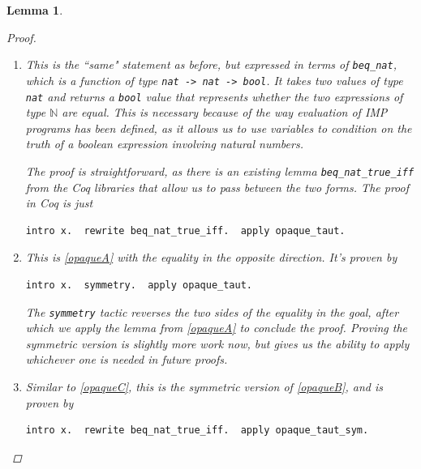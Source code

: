\documentclass[12pt,notitlepage]{report}
\theoremstyle{plain}
\newtheorem{lem}[theo]{Lemma}
\theoremstyle{definition}
\newcommand\N{\mathbb{N}}
\newcommand{\define}[1]{\emph{#1}\index{#1}}
\numberwithin{equation}{section}
\begin{document}
\begin{lem}
\begin{proof}
\begin{enumerate}
        Then, we apply \verb$rewrite -> mult_plus_distr_r$, which is analogous to the above for invoking the fact that multiplication is right-distributive over addition.  The goal now becomes 
        \[
            x * x + x + x + 1 = x * x + 1 * x + (x + 1) * 1.
        \]
        Finally, we conclude this proof with the \verb$omega$ tactic, which solves goals in \define{Presburger arithmetic}.  In particular, this can handle rewrites over linear arithmetic, which are now the only differences remaining between the left and right sides of the goal.
        \item
        This is the ``same" statement as before, but expressed in terms of \verb$beq_nat$, which is a function of type \verb$nat -> nat -> bool$.  It takes two values of type \verb$nat$ and returns a \verb$bool$ value that represents whether the two expressions of type $\N$ are equal.  This is necessary because of the way evaluation of IMP programs has been defined, as it allows us to use variables to condition on the truth of a boolean expression involving natural numbers.  
        \par The proof is straightforward, as there is an existing lemma \verb$beq_nat_true_iff$ from the Coq libraries that allow us to pass between the two forms.  The proof in Coq is just
        \begin{verbatim}intro x.  rewrite beq_nat_true_iff.  apply opaque_taut.\end{verbatim}
        \item
        This is \eqref{opaqueA} with the equality in the opposite direction.  It's proven by
        \begin{verbatim}intro x.  symmetry.  apply opaque_taut.\end{verbatim}  The \verb$symmetry$ tactic reverses the two sides of the equality in the goal, after which we apply the lemma from \eqref{opaqueA} to conclude the proof.  Proving the symmetric version is slightly more work now, but gives us the ability to apply whichever one is needed in future proofs.
        \item Similar to \eqref{opaqueC}, this is the symmetric version of \eqref{opaqueB}, and is proven by
        \begin{verbatim}intro x.  rewrite beq_nat_true_iff.  apply opaque_taut_sym.\end{verbatim}
    \end{enumerate}\qedhere
    \end{proof}
\end{lem}
\end{document}
